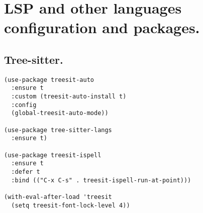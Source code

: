 \documentclass[11pt]{article}
\begin{document}
\section{LSP and other languages configuration and packages.}
\label{sec:orgb46788f}
\subsection{Tree-sitter.}
\label{sec:org76a222b}
\begin{verbatim}
(use-package treesit-auto
  :ensure t
  :custom (treesit-auto-install t)
  :config
  (global-treesit-auto-mode))

(use-package tree-sitter-langs
  :ensure t)

(use-package treesit-ispell
  :ensure t
  :defer t
  :bind (("C-x C-s" . treesit-ispell-run-at-point)))

(with-eval-after-load 'treesit
  (setq treesit-font-lock-level 4))
\end{verbatim}
\end{document}

